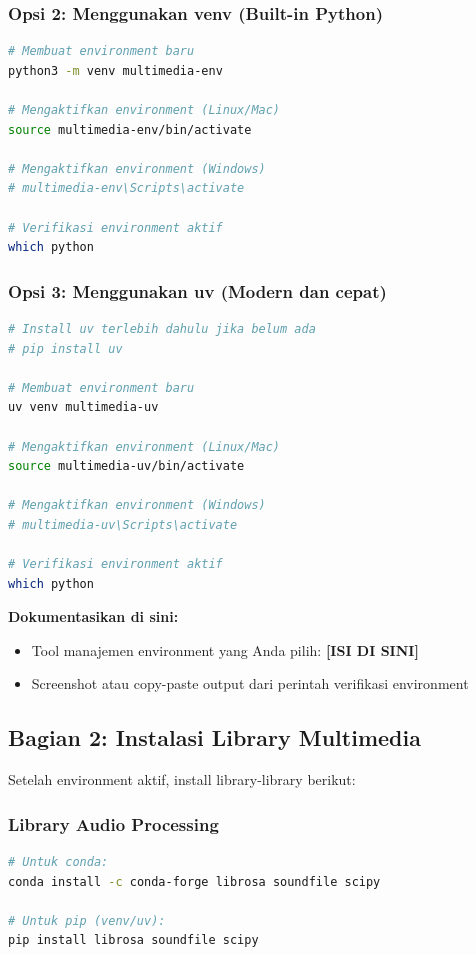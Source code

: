 \documentclass[11pt,a4paper]{article}
\begin{document}
\subsubsection{Opsi 2: Menggunakan venv (Built-in Python)}
\begin{lstlisting}[language=bash, caption=Membuat environment dengan venv]
# Membuat environment baru
python3 -m venv multimedia-env

# Mengaktifkan environment (Linux/Mac)
source multimedia-env/bin/activate

# Mengaktifkan environment (Windows)
# multimedia-env\Scripts\activate

# Verifikasi environment aktif
which python
\end{lstlisting}

\subsubsection{Opsi 3: Menggunakan uv (Modern dan cepat)}
\begin{lstlisting}[language=bash, caption=Membuat environment dengan uv]
# Install uv terlebih dahulu jika belum ada
# pip install uv

# Membuat environment baru
uv venv multimedia-uv

# Mengaktifkan environment (Linux/Mac)
source multimedia-uv/bin/activate

# Mengaktifkan environment (Windows)
# multimedia-uv\Scripts\activate

# Verifikasi environment aktif
which python
\end{lstlisting}

\textbf{Dokumentasikan di sini:}
\begin{itemize}
    \item Tool manajemen environment yang Anda pilih: \textbf{[ISI DI SINI]}
    \item Screenshot atau copy-paste output dari perintah verifikasi environment
\end{itemize}

\subsection{Bagian 2: Instalasi Library Multimedia}
Setelah environment aktif, install library-library berikut:

\subsubsection{Library Audio Processing}
\begin{lstlisting}[language=bash, caption=Instalasi library audio]
# Untuk conda:
conda install -c conda-forge librosa soundfile scipy

# Untuk pip (venv/uv):
pip install librosa soundfile scipy
\end{lstlisting}
\end{document}
